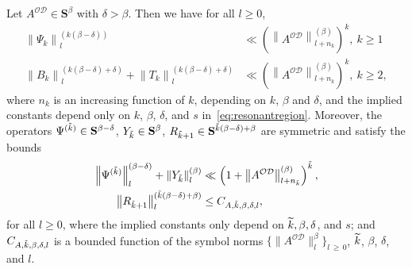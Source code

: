 \documentclass[10pt]{amsart}
\theoremstyle{definition}\newtheorem{defi}[theo]{Definition}\newtheorem{rema}[theo]{Remark}\newtheorem{exam}[theo]{Example}\newtheorem{nota}[theo]{Notation}
\newcommand{\CD}{\mathcal{D}}
\newcommand{\CO}{\mathcal{O}}
\newcommand{\COD}{{\CO\CD}}
\newcommand{\BS}{\mathbf S}
\newcommand{\snorm}[3]{\left\| #1\right\|_{#3}^{(#2)}}
\let\oldtilde\tilde
\renewcommand*{\tilde}[1]{\mathchoice{\widetilde{#1}}{\widetilde{#1}}{\oldtilde{#1}}{\oldtilde{#1}}}
\begin{document}
\begin{prop}\label{prop:symbolestweakgauge}
Let $A^{\CO\CD}\in\BS^\beta$ with $\delta>\beta$. Then we have for all $l\geq 0$,
\begin{equation}
\begin{split}\label{eq:boundspsilbltlparallelweakgauge}
\snorm{\Psi_k}{k(\beta-\delta)}{l}&\ll \left(\snorm{A^\COD}{\beta}{l+n_k}\right)^k,\ k\geq 1\\
\snorm{B_k}{k(\beta-\delta)+\delta}{l}+\snorm{T_k}{k(\beta-\delta)+\delta}{l}&
\ll \left(\snorm{A^\COD}{\beta}{l+n_k}\right)^k,\ k\geq 2,
\end{split}
\end{equation}
where $n_k$ is an increasing function of $k$, depending on $k$, $\beta$ and $\delta$, and the implied constants depend only on $k$, $\beta$, $\delta$, and $s$ in~\eqref{eq:resonantregion}. Moreover, the operators $\Psi^{(\tilde k)}\in\BS^{\beta-\delta}$, $Y_{\tilde{k}}\in\BS^{\beta}$, $R_{\tilde{k}+1}\in \BS^{\tilde{k}(\beta-\delta)+\beta}$ are symmetric and satisfy the bounds
\begin{equation}\label{eq:estpsiafterparallelgauge}
\begin{aligned}
\left\|\Psi^{(\tilde k)}\right\|^{(\beta-\delta)}_{l}+\snorm{Y_{\tilde{k}}}{\beta}{l}&\ll\left(1+\snorm{A^\COD}{\beta}{l+n_{\tilde{k}}}\right)^{\tilde{k}},\\
\snorm{R_{\tilde{k}+1}}{\tilde{k}(\beta-\delta)+\beta}{l}&\leq C_{A,\tilde{k},\beta,\delta,l},
\end{aligned}
\end{equation}
for all $l\geq 0$, where the implied constants only depend on $\tilde{k}, \beta, \delta$, and $s$; and $C_{A,\tilde{k},\beta,\delta,l}$ is a bounded function of the symbol norms $\lbrace \|A^\COD\|^{\beta}_{l}\rbrace_{l\,\geq\,0}$, $\tilde{k}$, $\beta$, $\delta$, and $l$.
\end{prop}
\end{document}
